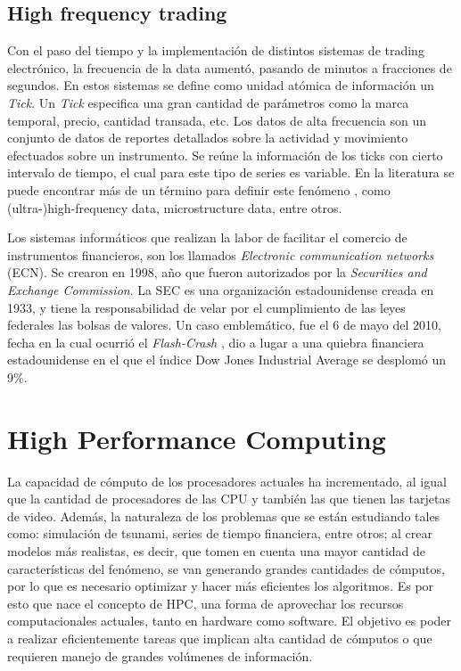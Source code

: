 \subsection{High frequency trading}

Con el paso del tiempo y la implementación de distintos sistemas de trading electrónico, la frecuencia de la data aumentó, pasando de minutos a fracciones de segundos. 
En estos sistemas se define como unidad atómica de información un \emph{Tick}. Un \emph{Tick} especifica una gran cantidad de parámetros como la marca temporal, precio, cantidad transada, etc. 
Los datos de alta frecuencia son un conjunto de datos de reportes detallados sobre la actividad y movimiento efectuados sobre un instrumento. Se reúne la información 
de los ticks con cierto intervalo de tiempo, el cual para este tipo de series es variable. En la literatura se puede encontrar más de un término para definir este fenómeno \cite{ei2007quantitative},
como (ultra-)high-frequency data, microstructure data, entre otros.

Los sistemas informáticos que realizan la labor de facilitar el comercio de instrumentos financieros, son los llamados \emph{Electronic communication networks} (ECN).
Se crearon en 1998, año que fueron autorizados por la \emph{Securities and Exchange Commission}. La SEC \cite{hasbrouck2004economic} es una organización estadounidense creada en 1933, 
y tiene la responsabilidad de velar por el cumplimiento de las leyes federales las bolsas de valores. Un caso emblemático, fue el 6 de mayo del 2010, fecha en la cual ocurrió el 
\emph{Flash-Crash} \cite{arndt2011high}, dio a lugar a una quiebra financiera estadounidense en el que el índice Dow Jones Industrial Average se desplomó un 9\%.

\section{High Performance Computing}

La capacidad de cómputo de los procesadores actuales ha incrementado, al igual que la cantidad de procesadores de las CPU y también las que tienen las tarjetas de video. Además, la
naturaleza de los problemas que se están estudiando tales como: simulación de tsunami, series de tiempo financiera, entre otros; al crear modelos más realistas, es decir, que tomen
en cuenta una mayor cantidad de características del fenómeno, se van generando grandes cantidades de cómputos, por lo que es
necesario optimizar y hacer más eficientes los algoritmos. Es por esto que nace el concepto de HPC, una forma de aprovechar los recursos computacionales actuales, tanto en hardware como
software. El objetivo es poder a realizar eficientemente tareas que implican alta cantidad de cómputos o que requieren manejo de grandes volúmenes de información. 

